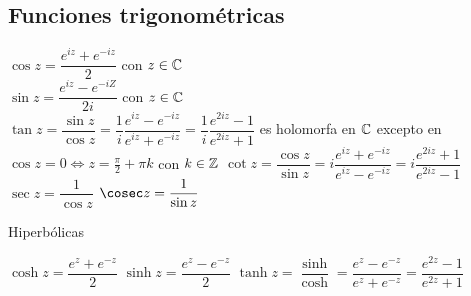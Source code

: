 \documentclass{report}
\begin{document}
    \subsection{Funciones trigonométricas}
        $\cos    z=\dfrac{e^{iz}+e^{-iz}}{2}$ con $z\in\mathbb{C}$\\
        $\sin    z=\dfrac{e^{iz}-e^{-iZ}}{2i}$ con $z\in\mathbb{C}$\\
        $\tan    z=\dfrac{\sin z}{\cos z}=\dfrac{1}{i}\dfrac{e^{iz}-e^{-iz}}{e^{iz}+e^{-iz}}=
          \dfrac{1}{i}\dfrac{e^{2iz}-1}{e^{2iz}+1}$ es holomorfa en $\mathbb{C}$ excepto en 
          $\cos  z=0 \Leftrightarrow z=\frac{\pi}{2} + \pi k$ con $k\in\mathbb{Z}$
        $\cot  z=\dfrac{\cos z}{\sin z}=i\dfrac{e^{iz}+e^{-iz}}{e^{iz}-e^{-iz}}=
          i\dfrac{e^{2iz}+1}{e^{2iz}-1}$
        $\sec    z=\dfrac{1}{\cos z}$
        $\cosec  z=\dfrac{1}{\sin z}$
        
        Hiperbólicas

        $\cosh z=\dfrac{e^z+e^{-z}}{2}$
        $\sinh z=\dfrac{e^z-e^{-z}}{2}$
        $\tanh z=\dfrac{\sinh}{\cosh}=\dfrac{e^z-e^{-z}}{e^z+e^{-z}}=\dfrac{e^{2z}-1}{e^{2z}+1}$

\end{document}
